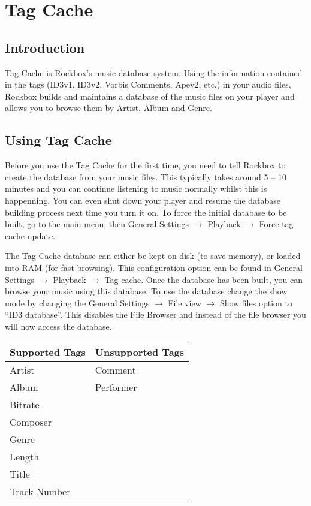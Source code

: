 \section{Tag Cache\label{ref:tagcache}} 

\subsection{Introduction}
Tag Cache is Rockbox's music database system. Using the information 
contained in the tags (ID3v1, ID3v2, Vorbis Comments, Apev2, etc.) in your 
audio files, Rockbox builds and maintains a database of the music files on 
your player and allows you to browse them by Artist, Album and Genre.

\subsection{Using Tag Cache}
Before you use the Tag Cache for the first time, you need to tell Rockbox to
create the database from your music files. This typically takes around 
5 -- 10 minutes and you can continue listening to music normally whilst 
this is happenning. You can even shut down your player and resume the 
database building process next time you turn it on.
To force the initial database to be built, go to the main menu, then 
General Settings $\rightarrow$ Playback $\rightarrow$ Force tag cache update.

The Tag Cache database can either be kept on disk (to save memory), or 
loaded into RAM (for fast browsing). This configuration option can be 
found in General Settings $\rightarrow$ Playback $\rightarrow$ Tag cache.
Once the database has been built, you can browse your music using this 
database. To use the database change the show mode by changing the General Settings $\rightarrow$ File view $\rightarrow$ Show files option to 
``ID3 database''. This disables the File Browser and instead of the file
browser you will now access the database.


\begin{table}
\begin{center}
  \begin{tabularx}{.75\textwidth}{XX}
  \toprule
  Supported Tags   & Unsupported Tags \\ 
  \midrule
  Artist           & Comment \\
  Album            & Performer\\
  Bitrate          & \\
  Composer         & \\
  Genre            & \\
  Length           & \\
  Title            & \\
  Track Number     & \\
  \bottomrule
  \end{tabularx}
\end{center}
\end{table}


